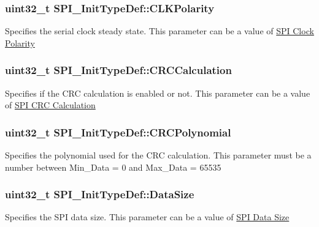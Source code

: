 \subsubsection[{\texorpdfstring{C\+L\+K\+Polarity}{CLKPolarity}}]{\setlength{\rightskip}{0pt plus 5cm}uint32\+\_\+t S\+P\+I\+\_\+\+Init\+Type\+Def\+::\+C\+L\+K\+Polarity}\hypertarget{struct_s_p_i___init_type_def_a96922c7ff9e589ebd9611fc4ab730454}{}\label{struct_s_p_i___init_type_def_a96922c7ff9e589ebd9611fc4ab730454}
Specifies the serial clock steady state. This parameter can be a value of \hyperlink{group___s_p_i___clock___polarity}{S\+PI Clock Polarity} 
\subsubsection[{\texorpdfstring{C\+R\+C\+Calculation}{CRCCalculation}}]{\setlength{\rightskip}{0pt plus 5cm}uint32\+\_\+t S\+P\+I\+\_\+\+Init\+Type\+Def\+::\+C\+R\+C\+Calculation}\hypertarget{struct_s_p_i___init_type_def_a3472de9bd9247c1d97312aff7e58e385}{}\label{struct_s_p_i___init_type_def_a3472de9bd9247c1d97312aff7e58e385}
Specifies if the C\+RC calculation is enabled or not. This parameter can be a value of \hyperlink{group___s_p_i___c_r_c___calculation}{S\+PI C\+RC Calculation} 
\subsubsection[{\texorpdfstring{C\+R\+C\+Polynomial}{CRCPolynomial}}]{\setlength{\rightskip}{0pt plus 5cm}uint32\+\_\+t S\+P\+I\+\_\+\+Init\+Type\+Def\+::\+C\+R\+C\+Polynomial}\hypertarget{struct_s_p_i___init_type_def_abdaf3ccbfa4ef68cc81fd32f29baa678}{}\label{struct_s_p_i___init_type_def_abdaf3ccbfa4ef68cc81fd32f29baa678}
Specifies the polynomial used for the C\+RC calculation. This parameter must be a number between Min\+\_\+\+Data = 0 and Max\+\_\+\+Data = 65535 
\subsubsection[{\texorpdfstring{Data\+Size}{DataSize}}]{\setlength{\rightskip}{0pt plus 5cm}uint32\+\_\+t S\+P\+I\+\_\+\+Init\+Type\+Def\+::\+Data\+Size}\hypertarget{struct_s_p_i___init_type_def_a24b7835dd877e1c4e55236303fa3387f}{}\label{struct_s_p_i___init_type_def_a24b7835dd877e1c4e55236303fa3387f}
Specifies the S\+PI data size. This parameter can be a value of \hyperlink{group___s_p_i__data__size}{S\+PI Data Size} 
